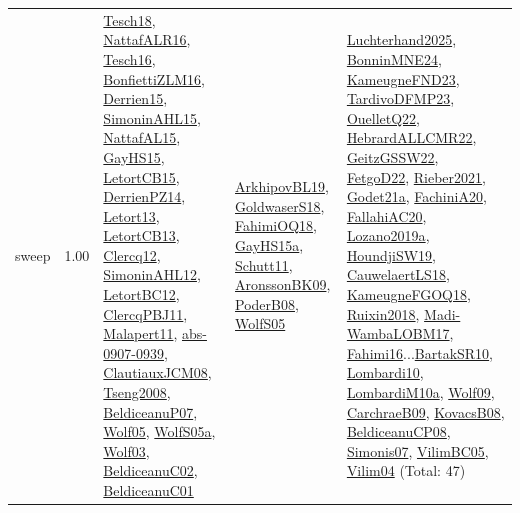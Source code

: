{\begin{longtable}{p{3cm}r>{\raggedright\arraybackslash}p{6cm}>{\raggedright\arraybackslash}p{6cm}>{\raggedright\arraybackslash}p{8cm}}
\index{sweep}\index{Algorithms!sweep}sweep &  1.00 & \hyperref[detail:Tesch18]{Tesch18}, \hyperref[detail:NattafALR16]{NattafALR16}, \hyperref[detail:Tesch16]{Tesch16}, \hyperref[detail:BonfiettiZLM16]{BonfiettiZLM16}, \hyperref[detail:Derrien15]{Derrien15}, \hyperref[detail:SimoninAHL15]{SimoninAHL15}, \hyperref[detail:NattafAL15]{NattafAL15}, \hyperref[detail:GayHS15]{GayHS15}, \hyperref[detail:LetortCB15]{LetortCB15}, \hyperref[detail:DerrienPZ14]{DerrienPZ14}, \hyperref[detail:Letort13]{Letort13}, \hyperref[detail:LetortCB13]{LetortCB13}, \hyperref[detail:Clercq12]{Clercq12}, \hyperref[detail:SimoninAHL12]{SimoninAHL12}, \hyperref[detail:LetortBC12]{LetortBC12}, \hyperref[detail:ClercqPBJ11]{ClercqPBJ11}, \hyperref[detail:Malapert11]{Malapert11}, \hyperref[detail:abs-0907-0939]{abs-0907-0939}, \hyperref[detail:ClautiauxJCM08]{ClautiauxJCM08}, \hyperref[detail:Tseng2008]{Tseng2008}, \hyperref[detail:BeldiceanuP07]{BeldiceanuP07}, \hyperref[detail:Wolf05]{Wolf05}, \hyperref[detail:WolfS05a]{WolfS05a}, \hyperref[detail:Wolf03]{Wolf03}, \hyperref[detail:BeldiceanuC02]{BeldiceanuC02}, \hyperref[detail:BeldiceanuC01]{BeldiceanuC01} & \hyperref[detail:ArkhipovBL19]{ArkhipovBL19}, \hyperref[detail:GoldwaserS18]{GoldwaserS18}, \hyperref[detail:FahimiOQ18]{FahimiOQ18}, \hyperref[detail:GayHS15a]{GayHS15a}, \hyperref[detail:Schutt11]{Schutt11}, \hyperref[detail:AronssonBK09]{AronssonBK09}, \hyperref[detail:PoderB08]{PoderB08}, \hyperref[detail:WolfS05]{WolfS05} & \hyperref[detail:Luchterhand2025]{Luchterhand2025}, \hyperref[detail:BonninMNE24]{BonninMNE24}, \hyperref[detail:KameugneFND23]{KameugneFND23}, \hyperref[detail:TardivoDFMP23]{TardivoDFMP23}, \hyperref[detail:OuelletQ22]{OuelletQ22}, \hyperref[detail:HebrardALLCMR22]{HebrardALLCMR22}, \hyperref[detail:GeitzGSSW22]{GeitzGSSW22}, \hyperref[detail:FetgoD22]{FetgoD22}, \hyperref[detail:Rieber2021]{Rieber2021}, \hyperref[detail:Godet21a]{Godet21a}, \hyperref[detail:FachiniA20]{FachiniA20}, \hyperref[detail:FallahiAC20]{FallahiAC20}, \hyperref[detail:Lozano2019a]{Lozano2019a}, \hyperref[detail:HoundjiSW19]{HoundjiSW19}, \hyperref[detail:CauwelaertLS18]{CauwelaertLS18}, \hyperref[detail:KameugneFGOQ18]{KameugneFGOQ18}, \hyperref[detail:Ruixin2018]{Ruixin2018}, \hyperref[detail:Madi-WambaLOBM17]{Madi-WambaLOBM17}, \hyperref[detail:Fahimi16]{Fahimi16}...\hyperref[detail:BartakSR10]{BartakSR10}, \hyperref[detail:Lombardi10]{Lombardi10}, \hyperref[detail:LombardiM10a]{LombardiM10a}, \hyperref[detail:Wolf09]{Wolf09}, \hyperref[detail:CarchraeB09]{CarchraeB09}, \hyperref[detail:KovacsB08]{KovacsB08}, \hyperref[detail:BeldiceanuCP08]{BeldiceanuCP08}, \hyperref[detail:Simonis07]{Simonis07}, \hyperref[detail:VilimBC05]{VilimBC05}, \hyperref[detail:Vilim04]{Vilim04} (Total: 47)\\

\end{longtable}}
